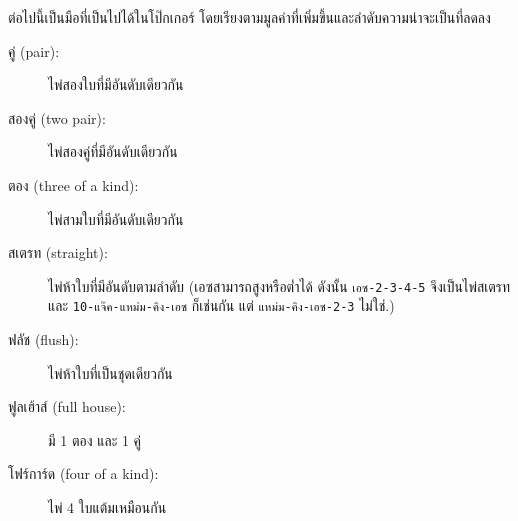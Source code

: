 \begin{exercise}
\label{poker}


ต่อไปนี้เป็นมือที่เป็นไปได้ในโป๊กเกอร์ โดยเรียงตามมูลค่าที่เพิ่มขึ้นและลำดับความน่าจะเป็นที่ลดลง

\begin{description}

\item[คู่ (pair):] ไพ่สองใบที่มีอันดับเดียวกัน
\vspace{-0.05in}

\item[สองคู่ (two pair):] ไพ่สองคู่ที่มีอันดับเดียวกัน
\vspace{-0.05in}

\item[ตอง (three of a kind):] ไพ่สามใบที่มีอันดับเดียวกัน
\vspace{-0.05in}

\item[สเตรท (straight):] ไพ่ห้าใบที่มีอันดับตามลำดับ (เอซสามารถสูงหรือต่ำได้ ดังนั้น {\tt เอซ-2-3-4-5} จึงเป็นไพ่สเตรท 
และ {\tt 10-แจ๊ค-แหม่ม-คิง-เอซ} ก็เช่นกัน แต่ {\tt แหม่ม-คิง-เอซ-2-3} ไม่ใช่.)
\vspace{-0.05in}

\item[ฟลัช (flush):] ไพ่ห้าใบที่เป็นชุดเดียวกัน
\vspace{-0.05in}

\item[ฟูลเฮ้าส์ (full house):] มี 1 ตอง และ 1 คู่
\vspace{-0.05in}

\item[โฟร์การ์ด (four of a kind):] ไพ่ 4 ใบแต้มเหมือนกัน
\vspace{-0.05in}


\end{description}
\end{exercise}
